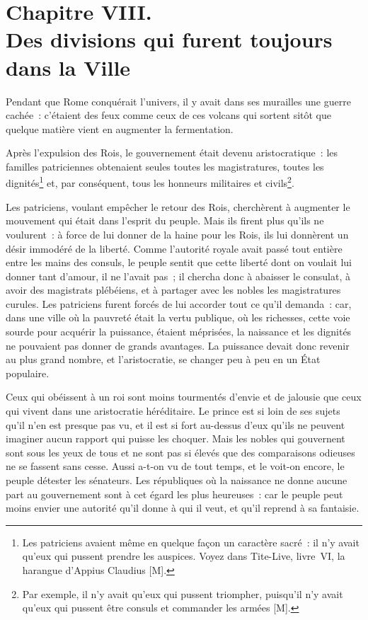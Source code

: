 \documentclass[french,twoside]{book} %
\newcommand\chapteropen{} %
\newcommand\chaptercont{} %
\begin{document}
\chapteropen
\chapter[{Chapitre VIII. Des divisions qui furent toujours dans la Ville}]{Chapitre VIII. \\
Des divisions qui furent toujours dans la Ville}
\label{considérations\_Romains\_chap\_08}\renewcommand{\leftmark}{Chapitre VIII. \\
Des divisions qui furent toujours dans la Ville}


\chaptercont
\noindent Pendant que Rome conquérait l’univers, il y avait dans ses murailles une guerre cachée : c’étaient des feux comme ceux de ces volcans qui sortent sitôt que quelque matière vient en augmenter la fermentation.\par
Après l’expulsion des Rois, le gouvernement était devenu aristocratique : les familles patriciennes obtenaient seules toutes les magistratures, toutes les dignités\footnote{Les patriciens avaient même en quelque façon un caractère sacré : il n’y avait qu’eux qui pussent prendre les auspices. Voyez dans Tite-Live, livre VI, la harangue d’Appius Claudius [M].} et, par conséquent, tous les honneurs militaires et civils\footnote{Par exemple, il n’y avait qu’eux qui pussent triompher, puisqu’il n’y avait qu’eux qui pussent être consuls et commander les armées [M].}.\par
Les patriciens, voulant empêcher le retour des Rois, cherchèrent à augmenter le mouvement qui était dans l’esprit du peuple. Mais ils firent plus qu’ils ne voulurent : à force de lui donner de la haine pour les Rois, ils lui donnèrent un désir immodéré de la liberté. Comme l’autorité royale avait passé tout entière entre les mains des consuls, le peuple sentit que cette liberté dont on voulait lui donner tant d’amour, il ne l’avait pas ; il chercha donc à abaisser le consulat, à avoir des magistrats plébéiens, et à partager avec les nobles les magistratures curules. Les patriciens furent forcés de lui accorder tout ce qu’il demanda : car, dans une ville où la pauvreté était la vertu publique, où les richesses, cette voie sourde pour acquérir la puissance, étaient méprisées, la naissance et les dignités ne pouvaient pas donner de grands avantages. La puissance devait donc revenir au plus grand nombre, et l’aristocratie, se changer peu à peu en un État populaire.\par
Ceux qui obéissent à un roi sont moins tourmentés d’envie et de jalousie que ceux qui vivent dans une aristocratie héréditaire. Le prince est si loin de ses sujets qu’il n’en est presque pas vu, et il est si fort au-dessus d’eux qu’ils ne peuvent imaginer aucun rapport qui puisse les choquer. Mais les nobles qui gouvernent sont sous les yeux de tous et ne sont pas si élevés que des comparaisons odieuses ne se fassent sans cesse. Aussi a-t-on vu de tout temps, et le voit-on encore, le peuple détester les sénateurs. Les républiques où la naissance ne donne aucune part au gouvernement sont à cet égard les plus heureuses : car le peuple peut moins envier une autorité qu’il donne à qui il veut, et qu’il reprend à sa fantaisie.\par
\end{document}

